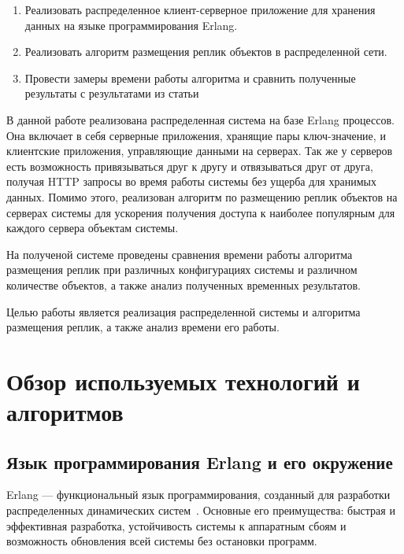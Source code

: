 





\Task
	\begin{enumerate}
		\item Реализовать распределенное клиент-серверное приложение 
		для хранения данных на языке программирования Erlang.
		
		\item Реализовать алгоритм размещения реплик объектов в 
		распределенной сети.
		
		\item Провести замеры времени работы алгоритма и сравнить 
		полученные результаты с результатами из статьи 
	\end{enumerate}
\newpage

\tableofcontents
\newpage

\Intro
	В данной работе реализована распределенная система на базе Erlang процессов. Она включает в себя серверные приложения, хранящие пары ключ-значение, и клиентские приложения,
	управляющие данными на серверах. Так же у серверов есть возможность привязываться друг к другу и отвязываться друг от друга, получая HTTP запросы во время работы системы без ущерба для
	хранимых данных. Помимо этого, реализован алгоритм по размещению реплик объектов на серверах системы для ускорения получения доступа к наиболее популярным для каждого сервера
	объектам системы.
	
	На полученой системе проведены сравнения времени работы алгоритма размещения реплик при различных конфигурациях системы и различном количестве объектов, а также анализ полученных 
	временных результатов.
	
	Целью работы является реализация распределенной системы и алгоритма размещения реплик, а также анализ времени его работы.
\newpage

\chapter{Обзор используемых технологий и алгоритмов}
	\section{Язык программирования Erlang и его окружение}
		Erlang --- функциональный язык программирования, созданный для разработки распределенных динамических систем~\cite{erl}.
		Основные его преимущества: быстрая и эффективная разработка, устойчивость системы к аппаратным сбоям и 
		возможность обновления всей системы без остановки программ.

